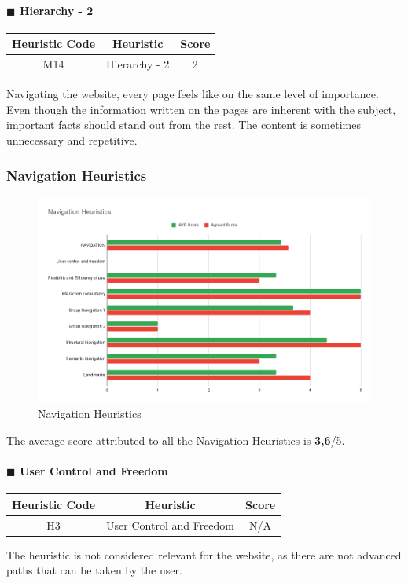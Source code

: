 \documentclass[11pt]{article} %
\begin{document}
\paragraph{$\blacksquare$ Hierarchy - 2}
\begin{center}
    \begin{tabular}{|c|c|c|} 
    \hline
    \textbf{Heuristic Code} & \textbf{Heuristic} & \textbf{Score}\\ 
    \hline
    M14 & Hierarchy - 2 & 2 \\
    \hline
    \end{tabular}
\end{center}
Navigating the website, every page feels like on the same level of importance. Even though the information written on the pages are inherent with the subject, important facts should stand out from the rest. The content is sometimes unnecessary and repetitive.


\subsubsection{Navigation Heuristics}
\begin{figure}[H]
  \centering
  \includegraphics[width=\textwidth]{Images/Navigation Heuristics.png}
  \caption{Navigation Heuristics}
\end{figure}

The average score attributed to all the Navigation Heuristics is \textbf{3,6}/5.

\paragraph{$\blacksquare$ User Control and Freedom}
\begin{center}
    \begin{tabular}{|c|c|c|} 
    \hline
    \textbf{Heuristic Code} & \textbf{Heuristic} & \textbf{Score}\\ 
    \hline
    H3 & User Control and Freedom & N/A \\
    \hline
    \end{tabular}
\end{center}
The heuristic is not considered relevant for the website, as there are not advanced paths that can be taken by the user. 
\end{document}
